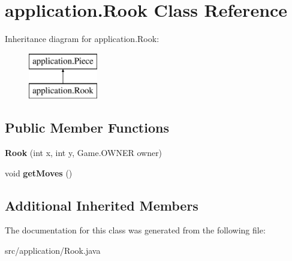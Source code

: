\hypertarget{classapplication_1_1_rook}{\section{application.\+Rook Class Reference}
\label{classapplication_1_1_rook}
}
Inheritance diagram for application.\+Rook\+:\begin{figure}[H]
\begin{center}
\leavevmode
\includegraphics[height=2.000000cm]{classapplication_1_1_rook}
\end{center}
\end{figure}
\subsection*{Public Member Functions}
\begin{DoxyCompactItemize}
\item 
\hypertarget{classapplication_1_1_rook_a748877f5e1bfca7a705a19b1832c5629}{{\bfseries Rook} (int x, int y, Game.\+O\+W\+N\+E\+R owner)}\label{classapplication_1_1_rook_a748877f5e1bfca7a705a19b1832c5629}

\item 
\hypertarget{classapplication_1_1_rook_a3a2f760f2cc7d5ee583df33b3b11ccd0}{void {\bfseries get\+Moves} ()}\label{classapplication_1_1_rook_a3a2f760f2cc7d5ee583df33b3b11ccd0}

\end{DoxyCompactItemize}
\subsection*{Additional Inherited Members}


The documentation for this class was generated from the following file\+:\begin{DoxyCompactItemize}
\item 
src/application/Rook.\+java\end{DoxyCompactItemize}
